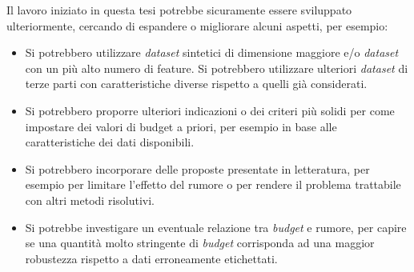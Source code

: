 Il lavoro iniziato in questa tesi potrebbe sicuramente essere sviluppato ulteriormente, cercando di espandere o migliorare alcuni aspetti, per esempio:
\begin{itemize}
    \item Si potrebbero utilizzare \emph{dataset} sintetici di dimensione maggiore e/o \emph{dataset} con un più alto numero di feature. Si potrebbero utilizzare ulteriori \emph{dataset} di terze parti con caratteristiche diverse rispetto a quelli già considerati.
    \item Si potrebbero proporre ulteriori indicazioni o dei criteri più solidi per come impostare dei valori di budget a priori, per esempio in base alle caratteristiche dei dati disponibili.
    \item Si potrebbero incorporare delle proposte presentate in letteratura, per esempio per limitare l'effetto del rumore o per rendere il problema trattabile con altri metodi risolutivi.
    \item Si potrebbe investigare un eventuale relazione tra \emph{budget} e rumore, per capire se una quantità molto stringente di \emph{budget} corrisponda ad una maggior robustezza rispetto a dati erroneamente etichettati.
\end{itemize}

